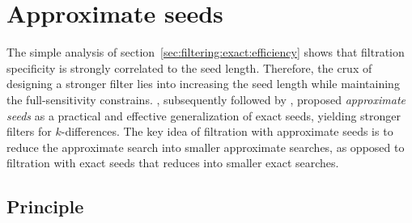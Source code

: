 

\section{Approximate seeds}
\label{sec:seeds-apx}

The simple analysis of section~\ref{sec:filtering:exact:efficiency} shows that filtration specificity is strongly correlated to the seed length.
Therefore, the crux of designing a stronger filter lies into increasing the seed length while maintaining the full-sensitivity constrains.
\citeauthor{Myers1994}, subsequently followed by \citeauthor{Navarro2000}, proposed \emph{approximate seeds} as a practical and effective generalization of exact seeds, yielding stronger filters for $k$-differences.
The key idea of filtration with approximate seeds is to reduce the approximate search into smaller approximate searches, as opposed to filtration with exact seeds that reduces into smaller exact searches.

\subsection{Principle}

